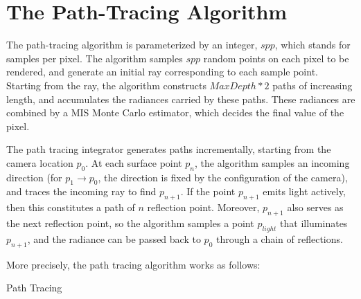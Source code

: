 \section{The Path-Tracing Algorithm}

The path-tracing algorithm is parameterized by an integer, $spp$, which stands for samples per pixel. The algorithm samples $spp$ random points on each pixel to be rendered, and generate an initial ray corresponding to each sample point. Starting from the ray, the algorithm constructs $MaxDepth*2$ paths of increasing length, and accumulates the radiances carried by these paths. These radiances are combined by a MIS Monte Carlo estimator, which decides the final value of the pixel.

The path tracing integrator generates paths incrementally, starting from the camera location $p_0$. At each surface point $p_n$, the algorithm samples an incoming direction (for $p_{1}\to p_0$, the direction is fixed by the configuration of the camera), and traces the incoming ray to find $p_{n+1}$. If the point $p_{n+1}$ emits light actively, then this constitutes a path of $n$ reflection point. Moreover, $p_{n+1}$ also serves as the next reflection point, so the algorithm samples a point $p_{light}$ that illuminates $p_{n+1}$, and the radiance can be passed back to $p_0$ through a chain of reflections.


More precisely, the path tracing algorithm works as follows:


\begin{algorithm}[H]
    \label{Path Tracing}
    \caption{Path Tracing}
\end{algorithm}

